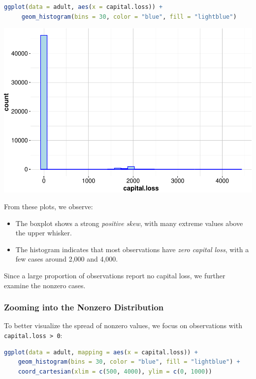 \documentclass[
]{book}
\newcommand{\passthrough}[1]{#1}
\providecommand{\tightlist}{%
  \setlength{\itemsep}{0pt}\setlength{\parskip}{0pt}}
\theoremstyle{definition}
\theoremstyle{definition}
\theoremstyle{definition}
\theoremstyle{definition}
\theoremstyle{remark}
\begin{document}
\begin{lstlisting}[language=R]
ggplot(data = adult, aes(x = capital.loss)) +
     geom_histogram(bins = 30, color = "blue", fill = "lightblue")
\end{lstlisting}

\begin{center}\includegraphics[width=0.7\linewidth]{data-preparation_files/figure-latex/unnamed-chunk-27-1} \end{center}

From these plots, we observe:

\begin{itemize}
\tightlist
\item
  The boxplot shows a strong \emph{positive skew}, with many extreme values above the upper whisker.\\
\item
  The histogram indicates that most observations have \emph{zero capital loss}, with a few cases around 2,000 and 4,000.
\end{itemize}

Since a large proportion of observations report no capital loss, we further examine the nonzero cases.

\subsubsection*{Zooming into the Nonzero Distribution}\label{zooming-into-the-nonzero-distribution}

To better visualize the spread of nonzero values, we focus on observations with \passthrough{\lstinline!capital.loss > 0!}:

\begin{lstlisting}[language=R]
ggplot(data = adult, mapping = aes(x = capital.loss)) +
    geom_histogram(bins = 30, color = "blue", fill = "lightblue") +
    coord_cartesian(xlim = c(500, 4000), ylim = c(0, 1000))
\end{lstlisting}
\end{document}
